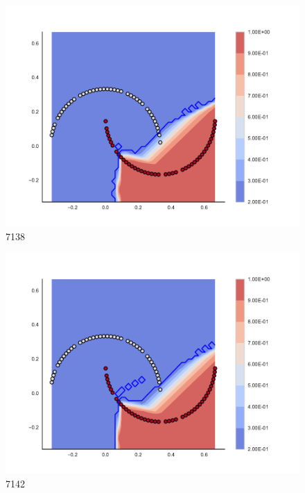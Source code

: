 \begin{subfigure}[b]{0.09\textwidth}
    \includegraphics[clip, trim=2.35cm 1.75cm 4.5cm 0cm,width=\textwidth]{img/convergence/7138.pdf}
    \caption{7138}
    \label{fig:convergence_7138}
\end{subfigure}
%
\begin{subfigure}[b]{0.09\textwidth}
    \includegraphics[clip, trim=2.35cm 1.75cm 4.5cm 0cm,width=\textwidth]{img/convergence/7142.pdf}
    \caption{7142}
    \label{fig:convergence_7142}
\end{subfigure}
%
